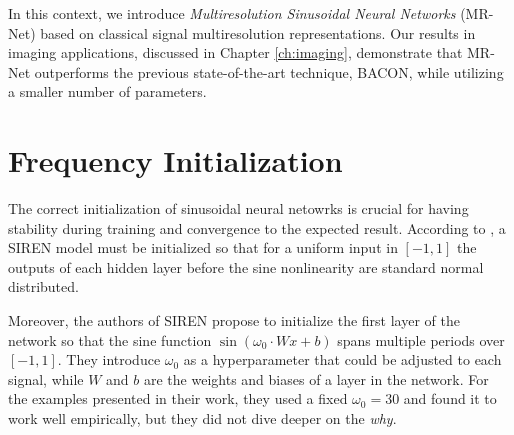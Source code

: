 In this context, we introduce \textit{Multiresolution Sinusoidal Neural Networks} (MR-Net) \cite{paz2022,paz2023mr} based on classical signal multiresolution representations. Our results in imaging applications, discussed in Chapter \ref{ch:imaging}, demonstrate that MR-Net outperforms the previous state-of-the-art technique, BACON, while utilizing a smaller number of parameters.


\section{Frequency Initialization}

The correct initialization of sinusoidal neural netowrks is crucial for having stability during training and convergence to the expected result. According to \cite{sitzmann2019siren}, a SIREN model must be initialized so that for a uniform input in $[-1, 1]$ the outputs of each hidden layer before the sine nonlinearity are standard normal distributed. 


Moreover, the authors of SIREN propose to initialize the first layer of the network so that the sine function $\sin(\omega_0 \cdot W x + b)$ spans multiple periods over $[-1, 1]$. They introduce $\omega_0$ as a hyperparameter that could be adjusted to each signal, while $W$ and $b$ are the weights and biases of a layer in the network. For the examples presented in their work, they used a fixed $\omega_0=30$ and found it to work well empirically, but they did not dive deeper on the \emph{why}.



